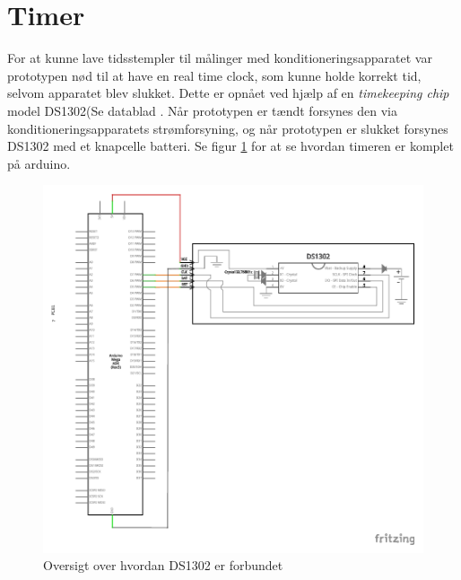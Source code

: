 \section{Timer}
For at kunne lave tidsstempler til målinger med konditioneringsapparatet var prototypen nød til at have en real time clock, som kunne holde korrekt tid, selvom apparatet blev slukket. Dette er opnået ved hjælp af en \textit{timekeeping chip} model DS1302(Se datablad . Når prototypen er tændt forsynes den via konditioneringsapparatets strømforsyning, og når prototypen er slukket forsynes DS1302 med et knapcelle batteri. Se figur \ref{fig:timerschematic} for at se hvordan timeren er komplet på arduino. 
\begin{figure}[H]
	\includegraphics[trim = 15 30 0 0, clip = true, width = \textwidth]{Implementeringsdokument/billeder/Timer_schem.pdf}
	\caption{Oversigt over hvordan DS1302 er forbundet}\label{fig:timerschematic}
\end{figure}

